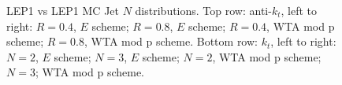\begin{figure}[H]
\hfill
{}\hfill
{}\hfill
\caption{LEP1 vs LEP1 MC Jet $N$ distributions. Top row: anti-$k_t$, left to right: $R=0.4$, $E$ scheme; $R=0.8$, $E$ scheme; $R=0.4$, WTA mod p scheme; $R=0.8$, WTA mod p scheme. Bottom row: $k_t$, left to right: $N=2$, $E$ scheme; $N=3$, $E$ scheme; $N=2$, WTA mod p scheme; $N=3$; WTA mod p scheme.}  
\end{figure} 

